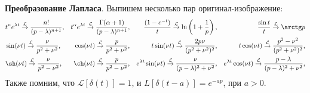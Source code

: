 \textbf{Преобразование Лапласа}. Выпишем несколько пар оригинал-изображение:
\begin{align*}
    &t^n e^{\lambda t}
     \overset{\mathcal L}{\to}
        \frac{n!}{(p-\lambda)^{n+1}},
    &t^\alpha e^{\lambda t}
     \overset{\mathcal L}{\to}
        \frac{\Gamma(\alpha+1)}{(p-\lambda)^{n+1}},
    &&\frac{\left(1-e^{-t}\right)}{t}
     \overset{\mathcal L}{\to}
        \ln \left(1 + \frac{1}{p}\right),
    &&\frac{\sin t}{t}
     \overset{\mathcal L}{\to}
        \arctg p
    \\
    &\sin(\nu t)
     \overset{\mathcal L}{\to}
        \frac{\nu}{p^2 + \nu^2},
    &\cos(\nu t)
     \overset{\mathcal L}{\to}
        \frac{p}{p^2 + \nu^2},
    &&t \sin(\nu t)
     \overset{\mathcal L}{\to}
        \frac{2 p \nu}{(p^2 + \nu^2)^2}, 
    &&t \cos (\nu t)
     \overset{\mathcal L}{\to}
        \frac{p^2 - \nu^2}{(p^2 + \nu^2)^2}, \\
    &\sh(\nu t)
     \overset{\mathcal L}{\to}
        \frac{\nu}{p^2 - \nu^2},
    &\ch(\nu t)
     \overset{\mathcal L}{\to}
        \frac{p}{p^2 - \nu^2},
    &&e^{\lambda t} \sin(\nu t)
     \overset{\mathcal L}{\to}
        \frac{\nu}{(p-\lambda)^2 + \nu^2}, 
    &&e^{\lambda t} \cos(\nu t)
     \overset{\mathcal L}{\to}
        \frac{p-\lambda}{(p-\lambda)^2 + \nu^2}, 
\end{align*}
Также помним, что $\mathcal L [\delta(t)] = 1$, и $L[\delta(t-a)] = e^{-ap}$, при $a > 0$. 


